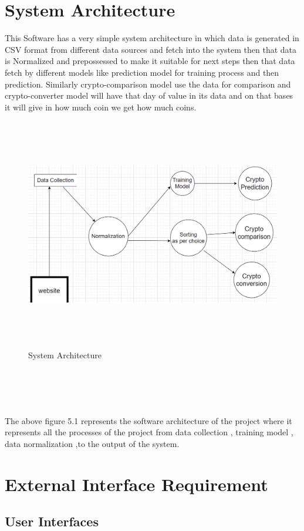 \documentclass[openany,12pt]{report}
\begin{document}
\section{System Architecture}
This Software has a very simple system architecture in which data is generated in CSV format from different data sources and fetch into the system then that data is Normalized and prepossessed to make it suitable for next steps then that data fetch by different models like prediction model for training process and then prediction. Similarly crypto-comparison model use the data for comparison and crypto-converter model will have that day of value in its data and on that bases it will give in how much coin we get how much coins.
\\
\begin{figure}[H]
\centering
\includegraphics[width=5in,height=4in]{./System.png}
\caption{System Architecture}
\end{figure}
\\
\\ \\ \\
The above figure 5.1 represents the software architecture of the project where it represents all the processes of the project from data collection , training model , data normalization ,to the output of the system.

\section{External Interface Requirement}

\subsection{User Interfaces}
\end{document}
